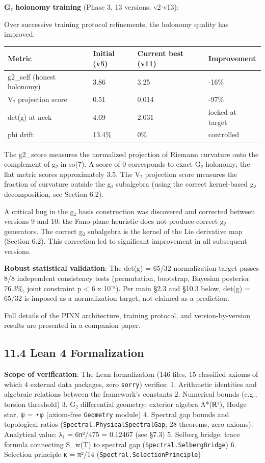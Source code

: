\documentclass[11pt,a4paper]{article}
\begin{document}
\textbf{G₂ holonomy training} (Phase 3, 13 versions, v2-v13):

Over successive training protocol refinements, the holonomy quality has improved:

\begin{longtable}[]{@{}llll@{}}
\toprule\noalign{}
Metric & Initial (v5) & Current best (v11) & Improvement \\
\midrule\noalign{}
\endhead
\bottomrule\noalign{}
\endlastfoot
g2\_\allowbreak{}self (honest holonomy) & 3.86 & 3.25 & -16\% \\
V₇ projection score & 0.51 & 0.014 & -97\% \\
det(g) at neck & 4.69 & 2.031 & locked at target \\
phi drift & 13.4\% & 0\% & controlled \\
\end{longtable}

The g2\_\allowbreak{}score measures the normalized projection of Riemann curvature onto the complement of g₂ in so(7). A score of 0 corresponds to exact G₂ holonomy; the flat metric scores approximately 3.5. The V₇ projection score measures the fraction of curvature outside the g₂ subalgebra (using the correct kernel-based g₂ decomposition, see Section 6.2).

A critical bug in the g₂ basis construction was discovered and corrected between versions 9 and 10: the Fano-plane heuristic does not produce correct g₂ generators. The correct g₂ subalgebra is the kernel of the Lie derivative map (Section 6.2). This correction led to significant improvement in all subsequent versions.

\textbf{Robust statistical validation}: The det(g) = 65/32 normalization target passes 8/8 independent consistency tests (permutation, bootstrap, Bayesian posterior 76.3\%, joint constraint p \textless{} 6 x 10⁻⁶). Per main §2.3 and §10.3 below, det(g) = 65/32 is imposed as a normalization target, not claimed as a prediction.

Full details of the PINN architecture, training protocol, and version-by-version results are presented in a companion paper.

\subsection{11.4 Lean 4 Formalization}\label{lean-4-formalization}

\textbf{Scope of verification}: The Lean formalization (146 files, 15 classified axioms of which 4 external data packages, zero \texttt{sorry}) verifies: 1. Arithmetic identities and algebraic relations between the framework's constants 2. Numerical bounds (e.g., torsion threshold) 3. G₂ differential geometry: exterior algebra Λ*(ℝ⁷), Hodge star, ψ = ⋆φ (axiom-free \texttt{Geometry} module) 4. Spectral gap bounds and topological ratios (\texttt{Spectral.\allowbreak{}Physical\allowbreak{}Spectral\allowbreak{}Gap}, 28 theorems, zero axioms). Analytical value: λ₁ = 6π²/475 = 0.12467 (see §7.3) 5. Selberg bridge: trace formula connecting S\_\allowbreak{}w(T) to spectral gap (\texttt{Spectral.\allowbreak{}Selberg\allowbreak{}Bridge}) 6. Selection principle κ = π²/14 (\texttt{Spectral.\allowbreak{}Selection\allowbreak{}Principle})
\end{document}
